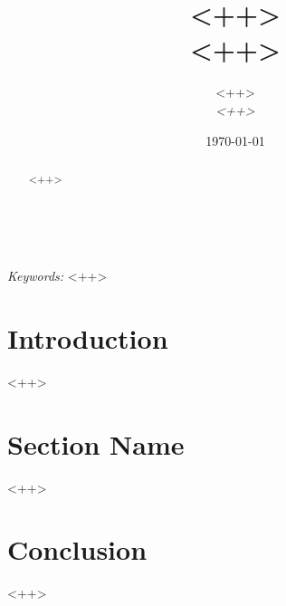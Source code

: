 \documentclass[a4paper, 11pt]{article}
\title{\textbf{<++>}\\ %
<++>} %
\author{\textsc{<++>} %
\\{\textit{<++>}}} %
\date{\today} %
\makeatletter
\renewcommand{\maketitle}{ %
\begin{flushright} %
{\LARGE\@title} %

\vspace{50pt} %

{\large\@author} %
\\\@date %

\vspace{40pt} %
\end{flushright}
}
\makeatother
\begin{document}
\maketitle %



\begin{abstract}
  <++>
\end{abstract}

\hspace*{3,6mm}\textit{Keywords:} <++> %

\vspace{30pt} %


\section*{Introduction}

<++>


\section*{Section Name}

<++>


\section*{Conclusion}

<++>

\printbibliography
\end{document}

